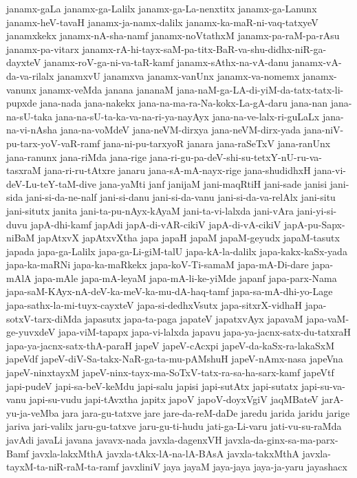 {janamx-gaLa
janamx-ga-Lalilx
janamx-ga-La-nenxtitx
janamx-ga-Lanunx
janamx-heV-tavaH
janamx-ja-namx-dalilx
janamx-ka-maR-ni-vaq-tatxyeV
janamxkekx
janamx-nA-sha-namf
janamx-noVtathxM
janamx-pa-raM-pa-rAsu
janamx-pa-vitarx
janamx-rA-hi-tayx-saM-pa-titx-BaR-va-shu-didhx-niR-ga-dayxteV
janamx-roV-ga-ni-va-taR-kamf
janamx-sAthx-na-vA-danu
janamx-vA-da-va-rilalx
janamxvU
janamxva
janamx-vanUnx
janamx-va-nomemx
janamx-vanunx
janamx-veMda
janana
jananaM
jana-naM-ga-LA-di-yiM-da-tatx-tatx-li-pupxde
jana-nada
jana-nakekx
jana-na-ma-ra-Na-kokx-La-gA-daru
jana-nan
jana-na-sU-taka
jana-na-sU-ta-ka-va-na-ri-ya-nayAyx
jana-na-ve-lalx-ri-guLaLx
jana-na-vi-nAsha
jana-na-voMdeV
jana-neVM-dirxya
jana-neVM-dirx-yada
jana-niV-pu-tarx-yoV-vaR-ramf
jana-ni-pu-tarxyoR
janara
jana-raSeTxV
jana-ranUnx
jana-ranunx
jana-riMda
jana-rige
jana-ri-gu-pa-deV-shi-su-tetxY-nU-ru-va-tasxraM
jana-ri-ru-tAtxre
janaru
jana-sA-mA-nayx-rige
jana-shudidhxH
jana-vi-deV-Lu-teY-taM-dive
jana-yaMti
janf
janijaM
jani-maqRtiH
jani-sade
janisi
jani-sida
jani-si-da-ne-nalf
jani-si-danu
jani-si-da-vanu
jani-si-da-va-relAlx
jani-situ
jani-situtx
janita
jani-ta-pu-nAyx-kAyaM
jani-ta-vi-lalxda
jani-vAra
jani-yi-si-duvu
japA-dhi-kamf
japAdi
japA-di-vAR-cikiV
japA-di-vA-cikiV
japA-pu-Sapx-niBaM
japAtxvX
japAtxvXtha
japa
japaH
japaM
japaM-geyudx
japaM-tasutx
japada
japa-ga-Lalilx
japa-ga-Li-giM-talU
japa-kA-la-dalilx
japa-kakx-kaSx-yada
japa-ka-maRNi
japa-ka-maRkekx
japa-koV-Ti-samaM
japa-mA-Di-dare
japa-mAlA
japa-mAle
japa-mA-leyaM
japa-mA-li-ke-yiMde
japanf
japa-parx-Nama
japa-saM-KAyx-nA-deV-ka-meV-ka-mu-dA-haq-tamf
japa-sa-mA-dhi-yo-Lage
japa-sathx-la-mi-tuyx-cayxteV
japa-si-dedhxVsutx
japa-sitxrX-vidhaH
japa-sotxV-tarx-diMda
japasutx
japa-ta-paga
japateV
japatxvAyx
japavaM
japa-vaM-ge-yuvxdeV
japa-viM-tapapx
japa-vi-lalxda
japavu
japa-ya-jacnx-satx-du-tatxraH
japa-ya-jacnx-satx-thA-paraH
japeV
japeV-cAcxpi
japeV-da-kaSx-ra-lakaSxM
japeVdf
japeV-diV-Sa-takx-NaR-ga-ta-mu-pAMshuH
japeV-nAmx-nasa
japeVna
japeV-ninxtayxM
japeV-ninx-tayx-ma-SoTxV-tatx-ra-sa-ha-sarx-kamf
japeVtf
japi-pudeV
japi-sa-beV-keMdu
japi-salu
japisi
japi-sutAtx
japi-sutatx
japi-su-va-vanu
japi-su-vudu
japi-tAvxtha
japitx
japoV
japoV-doyxVgiV
jaqMBateV
jarA-yu-ja-veMba
jara
jara-gu-tatxve
jare
jare-da-reM-daDe
jaredu
jarida
jaridu
jarige
jariva
jari-valilx
jaru-gu-tatxve
jaru-gu-ti-hudu
jati-ga-Li-varu
jati-vu-su-raMda
javAdi
javaLi
javana
javavx-nada
javxla-dagenxVH
javxla-da-ginx-sa-ma-parx-Bamf
javxla-lakxMthA
javxla-tAkx-lA-na-lA-BAsA
javxla-takxMthA
javxla-tayxM-ta-niR-raM-ta-ramf
javxliniV
jaya
jayaM
jaya-jaya
jaya-ja-yaru
jayashacx
}
